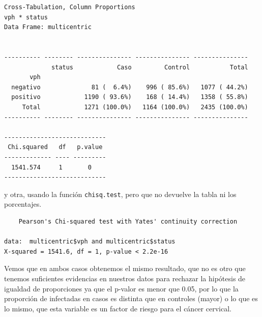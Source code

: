 \documentclass[
]{book}
\newenvironment{Shaded}{\begin{snugshade}}{\end{snugshade}}
\newcommand{\AttributeTok}[1]{\textcolor[rgb]{0.77,0.63,0.00}{#1}}
\newcommand{\ConstantTok}[1]{\textcolor[rgb]{0.00,0.00,0.00}{#1}}
\newcommand{\FunctionTok}[1]{\textcolor[rgb]{0.00,0.00,0.00}{#1}}
\newcommand{\NormalTok}[1]{#1}
\newcommand{\SpecialCharTok}[1]{\textcolor[rgb]{0.00,0.00,0.00}{#1}}
\newcommand{\StringTok}[1]{\textcolor[rgb]{0.31,0.60,0.02}{#1}}
\begin{document}
\begin{Shaded}
\end{Shaded}

\begin{verbatim}
Cross-Tabulation, Column Proportions  
vph * status  
Data Frame: multicentric  


---------- -------- --------------- --------------- ---------------
             status            Caso         Control           Total
       vph                                                         
  negativo              81 (  6.4%)    996 ( 85.6%)   1077 ( 44.2%)
  positivo            1190 ( 93.6%)    168 ( 14.4%)   1358 ( 55.8%)
     Total            1271 (100.0%)   1164 (100.0%)   2435 (100.0%)
---------- -------- --------------- --------------- ---------------

----------------------------
 Chi.squared   df   p.value 
------------- ---- ---------
  1541.574     1       0    
----------------------------
\end{verbatim}

y otra, usando la función \texttt{chisq.test}, pero que no devuelve la tabla ni los porcentajes.

\begin{Shaded}
\end{Shaded}

\begin{verbatim}
    Pearson's Chi-squared test with Yates' continuity correction

data:  multicentric$vph and multicentric$status
X-squared = 1541.6, df = 1, p-value < 2.2e-16
\end{verbatim}

Vemos que en ambos casos obtenemos el mismo resultado, que no es otro que tenemos suficientes evidencias en nuestros datos para rechazar la hipótesis de igualdad de proporciones ya que el p-valor es menor que 0.05, por lo que la proporción de infectadas en casos es distinta que en controles (mayor) o lo que es lo mismo, que esta variable es un factor de riesgo para el cáncer cervical.
\end{document}
